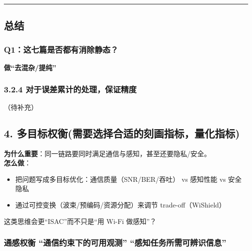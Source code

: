 \documentclass[
]{article}
\begin{document}
\begin{center}\rule{0.5\linewidth}{0.5pt}\end{center}

\subsection{总结}\label{ux603bux7ed3-2}

\subsubsection{Q1：这七篇是否都有消除静态？}\label{q1ux8fd9ux4e03ux7bc7ux662fux5426ux90fdux6709ux6d88ux9664ux9759ux6001}

\textbf{做``去混杂/提纯''}

\subsubsection{3.2.4
对于误差累计的处理，保证精度}\label{324-ux5bf9ux4e8eux8befux5deeux7d2fux8ba1ux7684ux5904ux7406ux4fddux8bc1ux7cbeux5ea6}

（待补充）

\subsection{4.
多目标权衡(需要选择合适的刻画指标，量化指标)}\label{4-ux591aux76eeux6807ux6743ux8861ux9700ux8981ux9009ux62e9ux5408ux9002ux7684ux523bux753bux6307ux6807ux91cfux5316ux6307ux6807}

\textbf{为什么重要}：同一链路要同时满足通信与感知，甚至还要隐私/安全。\\
\textbf{怎么做}：

\begin{itemize}
\item
  把问题写成多目标优化：通信质量（SNR/BER/吞吐） vs 感知性能 vs 安全隐私
\item
  通过可控变换（波束/预编码/资源分配）来调节 trade-off（WiShield）
\end{itemize}

这类思维会更``ISAC''而不只是``用 Wi-Fi 做感知''？

\subsubsection{通感权衡 ``通信约束下的可用观测''
``感知任务所需可辨识信息''}\label{ux901aux611fux6743ux8861--ux901aux4fe1ux7ea6ux675fux4e0bux7684ux53efux7528ux89c2ux6d4b-ux611fux77e5ux4efbux52a1ux6240ux9700ux53efux8fa8ux8bc6ux4fe1ux606f}
\end{document}
